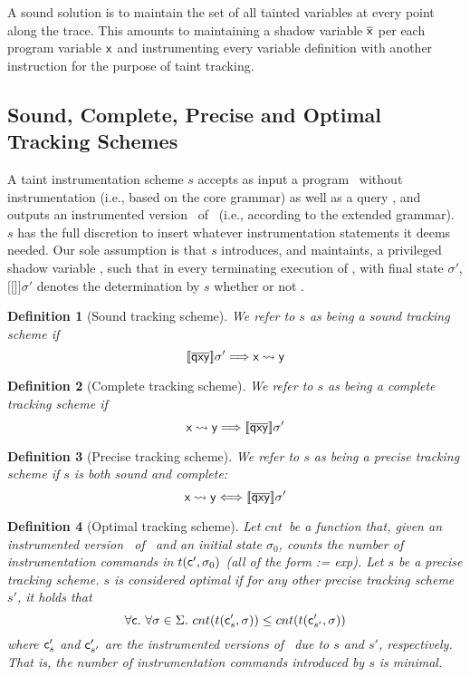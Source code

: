 \documentclass[]{article}
\newcommand{\lsyn}{[\![}
\newcommand{\rsyn}{]\!]}
\newtheorem{defn}{Definition}
\begin{document}
A sound solution is to maintain the set of all tainted variables at every point along the trace. This amounts to maintaining a shadow variable $\overline{{\sf x}}$ per each program variable ${\sf x}$ and instrumenting every variable definition with another instruction for the purpose of taint tracking. 

\subsection{Sound, Complete, Precise and Optimal Tracking Schemes}

A taint instrumentation scheme $s$ accepts as input a program \prog\ without instrumentation (i.e., based on the core grammar) as well as a query \query{\xvar}{\yvar}, and outputs an instrumented version \progp\ of \prog\ (i.e., according to the extended grammar). $s$ has the full discretion to insert whatever instrumentation statements it deems needed. Our sole assumption is that $s$ introduces, and maintaints, a privileged shadow variable
, such that in every terminating execution of \progp, with final state $\sigma'$, $\lsyn$$\rsyn \sigma'$ denotes the determination by $s$ whether or not \query{\xvar}{\yvar}.

\begin{defn}[Sound tracking scheme] We refer to $s$ as being a \emph{sound} tracking scheme if
	$$
		\lsyn \shadow{qxy} \rsyn \sigma' \Longrightarrow \query{\xvar}{\yvar}
	$$
\end{defn}

\begin{defn}[Complete tracking scheme] We refer to $s$ as being a \emph{complete} tracking scheme if
	$$
	\query{\xvar}{\yvar} \Longrightarrow \lsyn \shadow{qxy} \rsyn \sigma'
	$$
\end{defn}

\begin{defn}[Precise tracking scheme] We refer to $s$ as being a \emph{precise} tracking scheme if $s$ is both sound and complete:
	$$
	\query{\xvar}{\yvar} \Longleftrightarrow \lsyn \shadow{qxy} \rsyn \sigma'
	$$
\end{defn}

\newcommand{\cnt}{\ensuremath{cnt}}

\begin{defn}[Optimal tracking scheme] Let \cnt\ be a function that, given an instrumented version \progp\ of \prog\ and an initial state $\sigma_0$, 
	counts the number of instrumentation commands in $t({\sf c'},\sigma_0)$ (all of the form {\sf {} := exp}). Let $s$ be a precise tracking scheme. $s$ is considered \emph{optimal} if for any other precise tracking scheme $s'$,
	it holds that
	$$
		\forall \prog.\ \forall \sigma \in \Sigma.\ 
		\cnt(t(\prog'_s,\sigma)) \leq \cnt(t(\prog'_{s'},\sigma))
	$$
	where ${\sf c}'_s$ and ${\sf c}'_{s'}$ are the instrumented versions of \prog\ due to $s$ and $s'$, respectively.
	That is, the number of instrumentation commands introduced by $s$ is minimal.
\end{defn}
\end{document}
